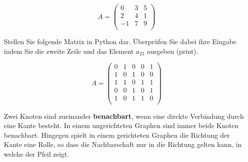 \[A =  \begin{pmatrix}
 0 & 3 & 5 \\
 2 & 4 & 1 \\
 -1& 7 & 9 \\
 \end{pmatrix}
  \]


\begin{aufg}
Stellen Sie folgende Matrix in Python dar. Überprüfen Sie dabei ihre Eingabe indem Sie die zweite Zeile und das Element $a_{23}$ ausgeben (print). 

\[ A =  \begin{pmatrix}
  0 & 1 & 0 & 0 & 1 \\
  1 & 0 & 1 & 0 & 0 \\
  1 & 1 & 0 & 1 & 1  \\
  0 & 0 & 1 & 0 & 1 \\
  1 & 0 & 1 & 1 & 0 \\
 \end{pmatrix}
\]

\end{aufg}



\begin{mdef}
Zwei Knoten sind zueinander \textbf{benachbart}, wenn eine direkte Verbindung durch eine Kante besteht. 
In einem ungerichteten Graphen sind immer beide Knoten benachbart. 
Hingegen spielt in einem gerichteten Graphen die Richtung der Kante eine Rolle, so dass die Nachbarschaft nur in die Richtung gelten kann, in welche der Pfeil zeigt.

\end{mdef}

